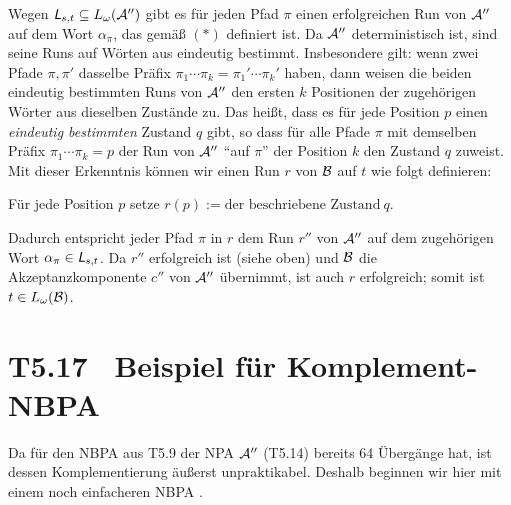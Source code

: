 \documentclass[fontsize=11pt, twoside=false, numbers=autoenddot]{scrbook}
\begin{document}
\begin{description}
    Wegen $\textsf{\textit{L}}_{s,t} \subseteq L_\omega(\mathcal{A}'')$ gibt es für jeden Pfad $\pi$
    einen erfolgreichen Run von $\mathcal{A}''$ auf dem Wort $\alpha_\pi$,
    das gemäß $(*)$ definiert ist.
    Da $\mathcal{A}''$ deterministisch ist, sind seine Runs auf Wörten aus \Lst
    eindeutig bestimmt.
    Insbesondere gilt: wenn zwei Pfade $\pi,\pi'$ dasselbe Präfix
    $\pi_1\cdots\pi_k=\pi_1'\cdots\pi_k'$ haben,
    dann weisen die beiden eindeutig bestimmten Runs von $\mathcal{A}''$
    den ersten $k$ Positionen der zugehörigen Wörter aus \Lst
    dieselben Zustände zu.
    Das heißt, dass es für jede Position $p$ einen \emph{eindeutig bestimmten}
    Zustand $q$ gibt, so dass für alle Pfade $\pi$ mit demselben Präfix $\pi_1\cdots\pi_k=p$
    der Run von $\mathcal{A}''$ "`auf $\pi$"' der Position $k$ den Zustand $q$ zuweist.
    Mit dieser Erkenntnis können wir einen Run $r$ von $\mathcal{B}$ auf $t$ wie folgt definieren:
    \begin{center}
      \parbox{.8\linewidth}{%
        Für jede Position $p$ setze $r(p) := \text{der beschriebene Zustand}~ q$.
      }
    \end{center}
    Dadurch entspricht jeder Pfad $\pi$ in $r$ dem Run $r''$ von $\mathcal{A}''$
    auf dem zugehörigen Wort $\alpha_\pi \in \textsf{\textit{L}}_{s,t}$.
    Da $r''$ erfolgreich ist (siehe oben) und $\mathcal{B}$ die Akzeptanzkomponente $c''$
    von $\mathcal{A}''$ übernimmt, ist auch $r$ erfolgreich;
    somit ist $t \in L_\omega(\mathcal{B})$.
    \qedhere
\end{description}

\goodbreak
\section*{T5.17~ Beispiel für Komplement-NBPA}

Da für den NBPA \Amc aus T5.9 der NPA $\mathcal{A}''$ (T5.14) bereits 64 Übergänge hat,
ist dessen Komplementierung äußerst unpraktikabel.
Deshalb beginnen wir hier mit einem noch einfacheren NBPA \Amc.
\end{document}
